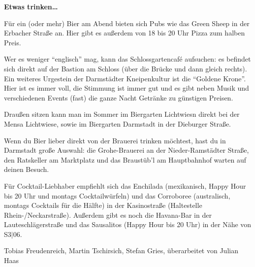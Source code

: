 {\textbf{Etwas trinken…}

Für ein (oder mehr) Bier am Abend bieten sich Pubs wie das Green Sheep in der Erbacher Straße an. Hier gibt es außerdem von 18 bis 20 Uhr Pizza zum halben Preis.

Wer es weniger "`englisch"' mag, kann das Schlossgartencaf\'e aufsuchen: es befindet sich direkt auf der Bastion am Schloss (über die Brücke und dann gleich rechts).
Ein weiteres Urgestein der Darmstädter Kneipenkultur ist die "`Goldene Krone"'. Hier ist es immer voll, die Stimmung ist immer gut und es gibt neben Musik und verschiedenen Events (fast) die ganze Nacht Getränke zu günstigen Preisen.

Draußen sitzen kann man im Sommer im Biergarten Lichtwiesn direkt bei der Mensa Lichtwiese, sowie im Biergarten Darmstadt in der Dieburger Straße.

Wenn du Bier lieber direkt von der Brauerei trinken möchtest, hast du in Darmstadt große Auswahl: die Grohe-Brauerei an der Nieder-Ramstädter Straße, den Ratskeller am Marktplatz und das Braustüb'l am Hauptbahnhof warten auf deinen Besuch.

Für Cocktail-Liebhaber empfiehlt sich das Enchilada (mexikanisch, Happy Hour bis 20 Uhr und montags Cocktailwürfeln) und das Corroboree (australisch, montags Cocktails für die Hälfte) in der Kasinostraße (Haltestelle Rhein-/Neckarstraße). Außerdem gibt es noch die Havana-Bar in der Lauteschlägerstraße und das Sausalitos (Happy Hour bis 20 Uhr) in der Nähe von S3$|$06.
}
{Tobias Freudenreich, Martin Tschirsich, Stefan Gries,
überarbeitet von Julian Haas}

\newpage
